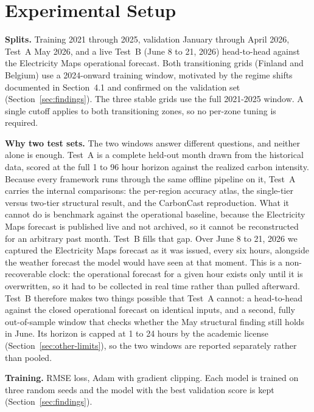 \documentclass[sigconf,nonacm,a4paper]{acmart}  %
\begin{document}
\section{Experimental Setup}
\textbf{Splits.} Training 2021 through 2025, validation January through April 2026,
Test~A May 2026, and a live Test~B (June 8 to 21, 2026) head-to-head against the
Electricity Maps operational forecast. Both transitioning grids (Finland and Belgium) use a 2024-onward training window,
motivated by the regime shifts documented in Section~4.1 and confirmed on the
validation set (Section~\ref{sec:findings}). The three stable grids use the full
2021-2025 window. A single cutoff applies to both transitioning zones, so no
per-zone tuning is required.

\textbf{Why two test sets.} The two windows answer different questions, and neither
alone is enough. Test~A is a complete held-out month drawn from the historical
data, scored at the full 1 to 96 hour horizon against the realized carbon
intensity. Because every framework runs through the same offline pipeline on it,
Test~A carries the internal comparisons: the per-region accuracy atlas, the
single-tier versus two-tier structural result, and the CarbonCast reproduction. What
it cannot do is benchmark against the operational baseline, because the Electricity
Maps forecast is published live and not archived, so it cannot be reconstructed for
an arbitrary past month. Test~B fills that gap. Over June 8 to 21, 2026 we captured
the Electricity Maps forecast as it was issued, every six hours, alongside the weather
forecast the model would have seen at that moment. This is a non-recoverable clock:
the operational forecast for a given hour exists only until it is overwritten, so it
had to be collected in real time rather than pulled afterward. Test~B therefore makes
two things possible that Test~A cannot: a head-to-head against the closed operational
forecast on identical inputs, and a second, fully out-of-sample window that checks
whether the May structural finding still holds in June. Its horizon is capped at 1 to
24 hours by the academic license (Section~\ref{sec:other-limits}), so the two windows
are reported separately rather than pooled.

\textbf{Training.} RMSE loss, Adam with gradient clipping. Each model is trained on
three random seeds and the model with the best validation score is kept
(Section~\ref{sec:findings}).


\end{document}
